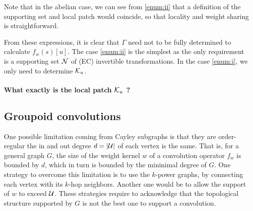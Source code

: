 \begin{remark}
Note that in the abelian case, we can see from \ref{enum:ii} that a definition of the supporting set and local patch would coincide, so that locality and weight sharing is straightforward.
\end{remark}

From these expressions, it is clear that $\Gamma$ need not to be fully determined to calculate $f_w(s)[u]$. The case \ref{enum:ii} is the simplest as the only requirement is a supporting set $\mathcal{N}$ of (EC) invertible transformations. In the case \ref{enum:i}, we only need to determine $\mathcal{K}_u$.

\paragraph{What exactly is the local patch $\mathcal{K}_u$ ?}

\todo{}





\subsection{Groupoid convolutions}

One possible limitation coming from Cayley subgraphs is that they are order-regular \ie the in and out degree $d = |\mathcal{U}|$ of each vertex is the same. That is, for a general graph $G$, the size of the weight kernel $w$ of a convolution operator $f_w$ is bounded by $d$, which in turn is bounded by the mininimal degree of $G$. One strategy to overcome this limitation is to use the $k$-power graphs, \ie by connecting each vertex with its $k$-hop neighbors. Another one would be to allow the support of $w$ to exceed $\mathcal{U}$. These strategies require to acknowledge that the topological structure supported by $G$ is not the best one to support a convolution.

